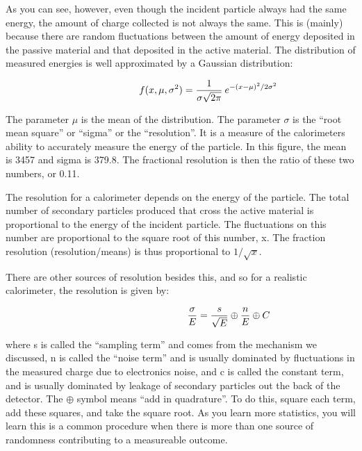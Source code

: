 \;
\noindent
As you can see, however, even though the incident particle always had the same energy, the amount of charge collected is not always the same. This is (mainly) because there are random fluctuations between the amount of energy deposited in the passive material and that deposited in the active material. The distribution of measured energies is well approximated by a Gaussian distribution:

\begin{equation}\hspace{20 mm}f(x,\mu,\sigma^{2}) = \frac{1}{\sigma\sqrt{2\pi }}\: e^{-(x-\mu)^{2}/2\sigma^{2}}\end{equation}

\;
\;

\noindent
The parameter $\mu$ is the mean of the distribution. The parameter $\sigma$ is the ``root mean square'' or ``sigma'' or the ``resolution''. It is a measure of the calorimeters ability to accurately measure the energy of the particle. In this figure, the mean is 3457 and sigma is 379.8. The fractional resolution is then the ratio of these two numbers, or 0.11.

\;
\noindent
The resolution for a calorimeter depends on the energy of the particle. The total number of secondary particles produced that cross the active material is proportional to the energy of the incident particle. The fluctuations on this number are proportional to the square root of this number, x. The fraction resolution (resolution/means) is thus proportional to $1/\sqrt{x}$.

\;
\noindent
There are other sources of resolution besides this, and so for a realistic calorimeter, the resolution is given by:

\begin{equation}\hspace{35 mm}\frac{\sigma }{E} = \frac{s}{\sqrt{E}} \oplus \frac{n}{E} \oplus C
\end{equation}

\;
\;

where s is called the ``sampling term'' and comes from the mechanism we discussed, n is called the ``noise term'' and is usually dominated by fluctuations in the measured charge due to electronics noise, and c is called the constant term, and is usually dominated by leakage of secondary particles out the back of the detector. The $\oplus$ symbol means ``add in quadrature''. To do this, square each term, add these squares, and take the square root.  As you learn more statistics, you will learn this is a common procedure when there is more than one source of randomness contributing to a measureable outcome.


